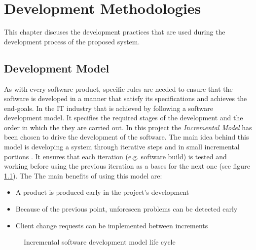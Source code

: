 \chapter{Development Methodologies}
\label{chapter:development_methodologies}
This chapter discuses the development practices that are used during the development process of the proposed system.  

\section{Development Model}
\label{section:development-model}
As with every software product, specific rules are needed to ensure that the software is developed in a manner that satisfy its specifications and achieves the end-goals. In the IT industry that is achieved by following a software development model. It specifies the required stages of the development and the order in which the they are carried out. In this project the \textit{Incremental Model} has been chosen to drive the development of the software. The main idea behind this model is developing a system through iterative steps and in small incremental portions \citep[264]{bhuvaneswari2013}. It ensures that each iteration (e.g. software build) is tested and working before using the previous iteration as a bases for the next one (see figure \ref{fig:incremental-model}). The The main benefits of using this model are:

\begin{itemize}
    \item A product is produced early in the project's development
    \item Because of the previous point, unforeseen problems can be detected early
    \item Client change requests can be implemented between increments
\end{itemize}

    \begin{figure}[H]
        \centering
        \caption{Incremental software development model life cycle}
        \label{fig:incremental-model}
    \end{figure}


